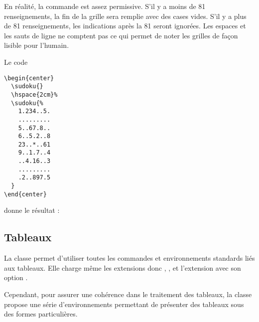 \documentclass[nocrop]{sesamanuel}
\begin{document}
En réalité, la commande est assez permissive. S'il y a moins de 81
renseignements, la fin de la grille sera remplie avec des cases vides.
S'il y a plus de 81 renseignements, les indications après la 81\ieme{}
seront ignorées. Les espaces et les sauts de ligne ne comptent pas ce
qui permet de noter les grilles de façon lisible pour l'humain.

Le code
\begin{verbatim}
\begin{center}
  \sudoku{}
  \hspace{2cm}%
  \sudoku{%
    1.234..5.
    .........
    5..67.8..
    6..5.2..8
    23..*..61
    9..1.7..4
    ..4.16..3
    .........
    .2..897.5
  }
\end{center}
\end{verbatim}
donne le résultat :
\begin{center}
  \sudoku{}
  \hspace{2cm}%
\end{center}

\subsection{Tableaux}
\label{sec-tableaux}
La classe permet d'utiliser toutes les commandes et environnements
standards liés aux tableaux. Elle charge même les extensions
 donc , ,
 et l'extension  avec son option
.

Cependant, pour assurer une cohérence dans le traitement des tableaux,
la classe propose une série d'environnements permettant de présenter
des tableaux sous des formes particulières.
\end{document}
